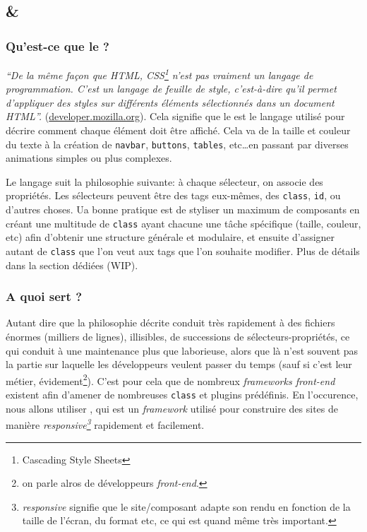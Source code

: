 \subsection[Bootstrap et CSS]{\bs{} \& \css{}}
\subsubsection[Qu'est-ce que le CSS?][fr.wikipedia.org/wiki/Feuilles\_de\_style\_en\_cascade]{Qu'est-ce que le \css{}?}\label{sec:css} 
\textit{``De la même façon que HTML, CSS\footnote{Cascading Style Sheets} n'est pas vraiment un langage de programmation. C'est un langage de feuille de style, c'est-à-dire qu'il permet d'appliquer des styles sur différents éléments sélectionnés dans un document HTML''.} (\href{https://developer.mozilla.org/fr/docs/Learn/Getting_started_with_the_web/CSS_basics}{developer.mozilla.org}). Cela signifie que le \css{} est le langage utilisé pour décrire comment chaque élément \html{} doit être affiché. Cela va de la taille et couleur du texte à la création de \verb|navbar|, \verb|buttons|, \verb|tables|, etc\ldots en passant par diverses animations simples ou plus complexes.

Le langage suit la philosophie suivante: à chaque sélecteur, on associe des propriétés. Les sélecteurs peuvent être des tags \html{} eux-mêmes, des \verb|class|, \verb|id|, ou d'autres choses. Ua bonne pratique est de styliser un maximum de composants en créant une multitude de \verb|class| ayant chacune une tâche spécifique (taille, couleur, etc) afin d'obtenir une structure générale et modulaire, et ensuite d'assigner autant de \verb|class| que l'on veut aux tags \html{} que l'on souhaite modifier. Plus de détails dans la section dédiées (WIP).

\subsubsection[A quoi sert Bootstrap?][fr.wikipedia.org/wiki/Bootstrap\_(framework)]{A quoi sert \bs{}?}
Autant dire que la philosophie décrite conduit très rapidement à des fichiers énormes (milliers de lignes), illisibles, de successions de sélecteurs-propriétés, ce qui conduit à une maintenance plus que laborieuse, alors que là n'est souvent pas la partie sur laquelle les développeurs veulent passer du temps (sauf si c'est leur métier, évidement\footnote{on parle alros de développeurs \textit{front-end}.}). C'est pour cela que de nombreux \textit{frameworks front-end} existent afin d'amener de nombreuses \verb|class| et plugins \js{} prédéfinis. En l'occurence, nous allons utiliser \bs{}, qui est un \textit{framework} utilisé pour construire des sites de manière \textit{responsive\footnote{\textit{responsive} signifie que le site/composant adapte son rendu en fonction de la taille de l'écran, du format etc, ce qui est quand même très important.}} rapidement et facilement.

